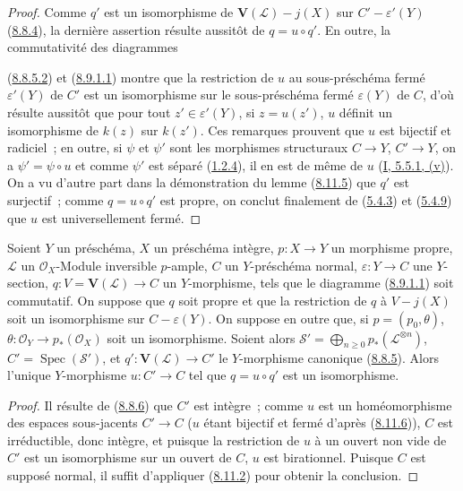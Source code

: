 \begin{proof}
Comme $q'$ est un isomorphisme de $\mathbf{V}(\mathcal{L})-j(X)$ sur
$C'-\varepsilon'(Y)$ (\hyperref[II.8.8.4-fr]{8.8.4}), la dernière assertion
résulte aussitôt de $q=u\circ q'$. En outre, la commutativité des diagrammes

(\hyperref[II.8.8.5.2-fr]{8.8.5.2}) et
(\hyperref[II.8.9.1.1-fr]{8.9.1.1}) montre que la restriction de $u$ au
sous-préschéma fermé $\varepsilon'(Y)$ de $C'$ est un isomorphisme sur le
sous-préschéma fermé $\varepsilon(Y)$ de $C$, d'où résulte aussitôt que pour
tout $z'\in\varepsilon'(Y)$, si $z=u(z')$, $u$ définit un isomorphisme de
$k(z)$ sur $k(z')$. Ces remarques prouvent que $u$ est bijectif et radiciel~;
en outre, si $\psi$ et $\psi'$ sont les morphismes structuraux $C\to Y$,
$C'\to Y$, on a $\psi'=\psi\circ u$ et comme $\psi'$ est séparé
(\hyperref[II.1.2.4-fr]{1.2.4}), il en est de même de $u$
(\hyperref[I.5.5.1-fr]{I, 5.5.1, (v)}). On a vu d'autre part dans la
démonstration du lemme (\hyperref[II.8.11.5-fr]{8.11.5}) que $q'$ est
surjectif~; comme $q=u\circ q'$ est propre, on conclut finalement de
(\hyperref[II.5.4.3-fr]{5.4.3}) et (\hyperref[II.5.4.9-fr]{5.4.9}) que $u$
est universellement fermé.
\end{proof}

\begin{proposition}[8.11.7]
\label{II.8.11.7-fr}
Soient $Y$ un préschéma, $X$ un préschéma intègre, $p:X\to Y$ un morphisme
propre, $\mathcal{L}$ un $\mathcal{O}_X$-Module inversible $p$-ample, $C$ un
$Y$-préschéma normal, $\varepsilon:Y\to C$ une $Y$-section,
$q:V=\mathbf{V}(\mathcal{L})\to C$ un $Y$-morphisme, tels que le diagramme
(\hyperref[II.8.9.1.1-fr]{8.9.1.1}) soit commutatif. On suppose que $q$ soit
propre et que la restriction de $q$ à $V-j(X)$ soit un isomorphisme sur
$C-\varepsilon(Y)$. On suppose en outre que,
si $p=(p_0,\theta)$, $\theta:\mathcal{O}_Y\to p_*(\mathcal{O}_X)$ soit un
isomorphisme. Soient alors
$\mathcal{S}'=\bigoplus_{n\geqslant0}p_*(\mathcal{L}^{\otimes n})$,
$C'=\operatorname{Spec}(\mathcal{S}')$, et
$q':\mathbf{V}(\mathcal{L})\to C'$ le $Y$-morphisme canonique
(\hyperref[II.8.8.5-fr]{8.8.5}). Alors l'unique $Y$-morphisme $u:C'\to C$ tel
que $q=u\circ q'$ est un isomorphisme.
\end{proposition}

\begin{proof}
Il résulte de (\hyperref[II.8.8.6-fr]{8.8.6}) que $C'$ est intègre~; comme
$u$ est un homéomorphisme des espaces sous-jacents $C'\to C$ ($u$ étant
bijectif et fermé d'après (\hyperref[II.8.11.6-fr]{8.11.6})), $C$ est
irréductible, donc intègre, et puisque la restriction de $u$ à un ouvert non
vide de $C'$ est un isomorphisme sur un ouvert de $C$, $u$ est birationnel.
Puisque $C$ est supposé normal, il suffit d'appliquer
(\hyperref[II.8.11.2-fr]{8.11.2}) pour obtenir la conclusion.
\end{proof}

